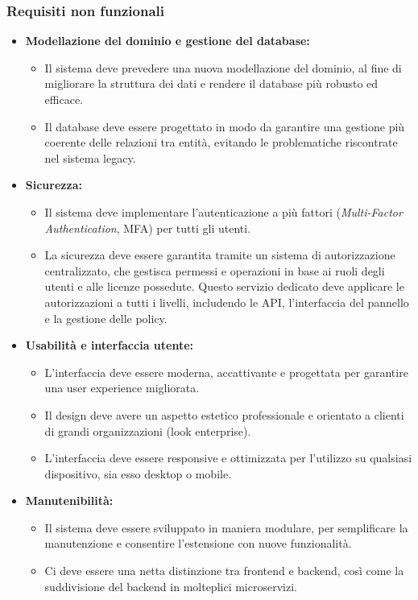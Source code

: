 \subsubsection{Requisiti non funzionali}
\begin{itemize}
  \item \textbf{Modellazione del dominio e gestione del database:}
    \begin{itemize}
      \item Il sistema deve prevedere una nuova modellazione del dominio, al fine di migliorare la struttura dei dati e rendere il database più robusto ed efficace.
      \item Il database deve essere progettato in modo da garantire una gestione più coerente delle relazioni tra entità, evitando le problematiche riscontrate nel sistema legacy.
    \end{itemize}

  \item \textbf{Sicurezza:}
    \begin{itemize}
      \item Il sistema deve implementare l’autenticazione a più fattori (\textit{Multi-Factor Authentication}, MFA) per tutti gli utenti.
      \item La sicurezza deve essere garantita tramite un sistema di autorizzazione centralizzato, che gestisca permessi e operazioni in base ai ruoli degli utenti e alle licenze possedute. Questo servizio dedicato deve applicare le autorizzazioni a tutti i livelli, includendo le API, l’interfaccia del pannello e la gestione delle policy.
    \end{itemize}

  \item \textbf{Usabilità e interfaccia utente:}
    \begin{itemize}
      \item L’interfaccia deve essere moderna, accattivante e progettata per garantire una user experience migliorata.
      \item Il design deve avere un aspetto estetico professionale e orientato a clienti di grandi organizzazioni (look enterprise).
      \item L’interfaccia deve essere responsive e ottimizzata per l’utilizzo su qualsiasi dispositivo, sia esso desktop o mobile.
    \end{itemize}

  \item \textbf{Manutenibilità:}
    \begin{itemize}
      \item Il sistema deve essere sviluppato in maniera modulare, per semplificare la manutenzione e consentire l’estensione con nuove funzionalità.
      \item Ci deve essere una netta distinzione tra frontend e backend, così come la suddivisione del backend in molteplici microservizi.
    \end{itemize}
\end{itemize}

